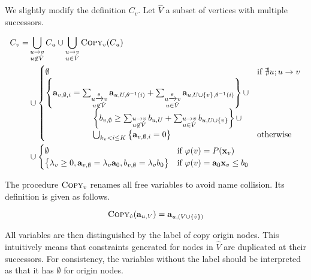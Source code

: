 \documentclass[a4paper,12pt]{article}
\begin{document}
We slightly modify the definition $C_v$. Let $\hat V$ a subset of
vertices with multiple successors.

\begin{align*}
C_v = & \bigcup_{\substack{u \rightarrow v \\ u \not\in \hat V}} C_u \cup
\bigcup_{\substack{u \rightarrow v \\ u \in \hat V}} \textsc{Copy}_v (C_u)
\\
& \cup \begin{cases}
\emptyset
& \mbox{if } \nexists u; u \rightarrow v \\
\left\lbrace
 \mathbf{a}_{v,\emptyset,i} =
  \sum_{\substack{u \xrightarrow{\theta} v \\ u \not\in \hat V}} \mathbf{a}_{u,U,\theta^{-1}(i)} +
  \sum_{\substack{u \xrightarrow{\theta} v \\ u \in \hat V}}
  \mathbf{a}_{u,U \cup \left\lbrace v \right\rbrace, \theta^{-1}(i)}
\right\rbrace \cup \\
\hspace{2cm} \left\lbrace
 b_{v,\emptyset} \geq
  \sum_{\substack{u \rightarrow v \\ u \not\in \hat V}} b_{u,U} +
  \sum_{\substack{u \rightarrow v \\ u \in \hat V}} b_{u,U \cup \left\lbrace v \right\rbrace}
\right\rbrace \cup \\
\hspace{2cm} \bigcup_{k_v < i \leq K} \left\lbrace \mathbf{a}_{v,\emptyset,i} = 0 \right\rbrace
& \mbox{otherwise}
\end{cases}
\\
& \cup \begin{cases}
\emptyset
& \mbox{if } \varphi(v) = P(\mathbf{x}_v) \\
\left\lbrace
 \lambda_v \geq 0, \mathbf{a}_{v,\emptyset} = \lambda_v \mathbf{a}_0,
 b_{v,\emptyset} = \lambda_v b_0
\right\rbrace
& \mbox{if } \varphi(v) = \mathbf{a}_0 \mathbf{x}_v \leq b_0
\end{cases}
\end{align*}

The procedure $\textsc{Copy}_v$ renames all free variables to avoid
name collision. Its definition is given as follows.

\[\textsc{Copy}_{\hat v}(\mathbf{a}_{u,V}) = \mathbf{a}_{u,(V \cup
  \left\lbrace \hat v \right\rbrace)} \]

All variables are then distinguished by the label of copy origin
nodes. This intuitively means that constraints generated for nodes in
$\hat V$ are duplicated at their successors. For consistency, the
variables without the label should be interpreted as that it has
$\emptyset$ for origin nodes.
\end{document}

